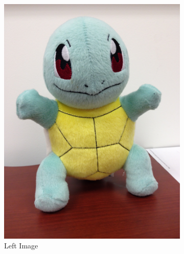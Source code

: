 \documentclass[11pt,psfig]{article}
\begin{document}
\begin{figure}
        \centering
        \begin{subfigure}[b]{0.4\textwidth}
                \includegraphics[width=\textwidth]{squirtle1.jpg}
		\caption{Left Image}
        \end{subfigure}
        \begin{subfigure}[b]{0.4\textwidth}

\end{subfigure}
\end{figure}
\end{document}
